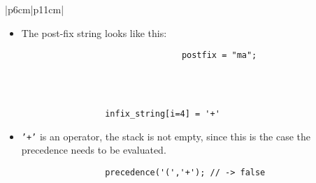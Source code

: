 \begin{center}
\begin{longtable}{ |p{6cm}|p{11cm}| }
\begin{itemize}
                    \item The post-fix string looks like this: 
                        {
                            \begin{verbatim}
                                postfix = "ma";
                            \end{verbatim}
                        }
                \end{itemize}
            \\
        
        \hline
        \hline
             \\
        \hline
        \hline        
        {
                \begin{verbatim}
                    infix_string[i=4] = '+'
                \end{verbatim}
            }
            \begin{itemize}
                \item \texttt{'+'} is an operator, the stack is not empty, since this is the case the precedence needs to be evaluated.
            \end{itemize}
            {
                \begin{verbatim}
                    precedence('(','+'); // -> false

\end{verbatim}}
\end{longtable}
\end{center}
